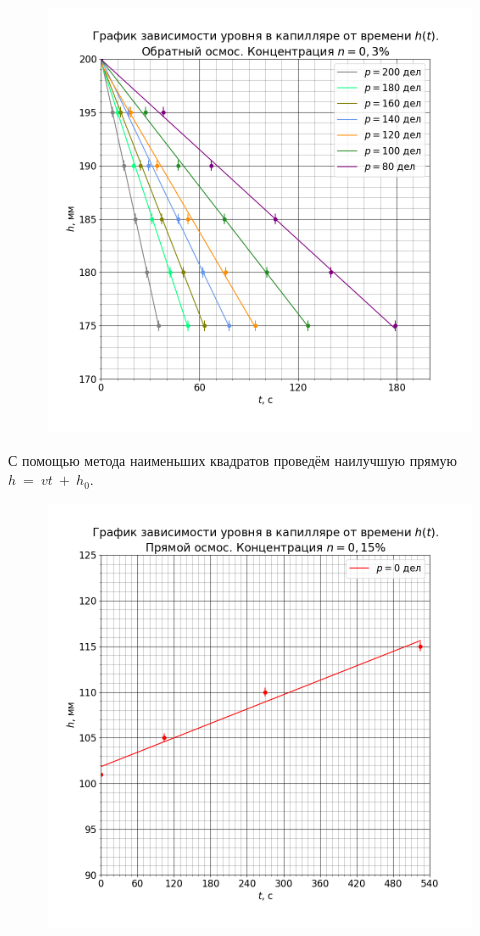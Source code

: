 \begin{figure}[H]
	\centering
	\includegraphics[width=1 \textwidth]{../plots/graph h_t n0.3 reverse.png}
\end{figure}

С помощью метода наименьших квадратов проведём наилучшую прямую $h~=~vt~+~h_0$.




\begin{figure}[H]
	\centering
	\includegraphics[width=1 \textwidth]{../plots/graph h_t n0.15 straight.png}
\end{figure}


